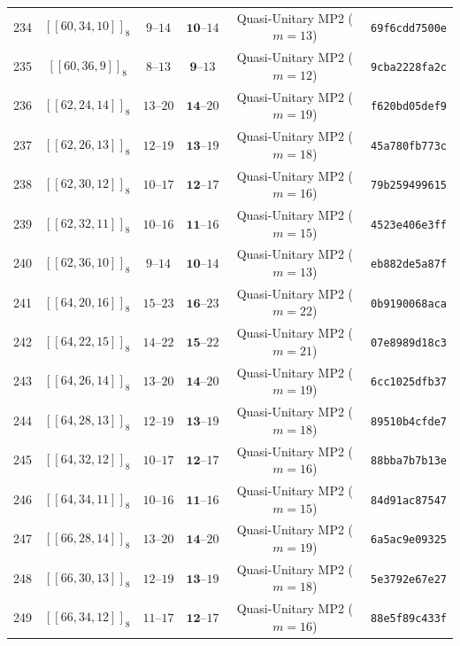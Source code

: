 \documentclass[11pt,a4paper]{article}
\theoremstyle{remark}
\begin{document}
{\begin{longtable}{@{}rccccl@{}}
234 & $[[60,34,10]]_{8}$ & $9\text{--}14$ & $\mathbf{10}\text{--}14$ & Quasi-Unitary MP2 ($m=13$) & \texttt{69f6cdd7500e} \\
235 & $[[60,36,9]]_{8}$ & $8\text{--}13$ & $\mathbf{9}\text{--}13$ & Quasi-Unitary MP2 ($m=12$) & \texttt{9cba2228fa2c} \\
236 & $[[62,24,14]]_{8}$ & $13\text{--}20$ & $\mathbf{14}\text{--}20$ & Quasi-Unitary MP2 ($m=19$) & \texttt{f620bd05def9} \\
237 & $[[62,26,13]]_{8}$ & $12\text{--}19$ & $\mathbf{13}\text{--}19$ & Quasi-Unitary MP2 ($m=18$) & \texttt{45a780fb773c} \\
238 & $[[62,30,12]]_{8}$ & $10\text{--}17$ & $\mathbf{12}\text{--}17$ & Quasi-Unitary MP2 ($m=16$) & \texttt{79b259499615} \\
239 & $[[62,32,11]]_{8}$ & $10\text{--}16$ & $\mathbf{11}\text{--}16$ & Quasi-Unitary MP2 ($m=15$) & \texttt{4523e406e3ff} \\
240 & $[[62,36,10]]_{8}$ & $9\text{--}14$ & $\mathbf{10}\text{--}14$ & Quasi-Unitary MP2 ($m=13$) & \texttt{eb882de5a87f} \\
241 & $[[64,20,16]]_{8}$ & $15\text{--}23$ & $\mathbf{16}\text{--}23$ & Quasi-Unitary MP2 ($m=22$) & \texttt{0b9190068aca} \\
242 & $[[64,22,15]]_{8}$ & $14\text{--}22$ & $\mathbf{15}\text{--}22$ & Quasi-Unitary MP2 ($m=21$) & \texttt{07e8989d18c3} \\
243 & $[[64,26,14]]_{8}$ & $13\text{--}20$ & $\mathbf{14}\text{--}20$ & Quasi-Unitary MP2 ($m=19$) & \texttt{6cc1025dfb37} \\
244 & $[[64,28,13]]_{8}$ & $12\text{--}19$ & $\mathbf{13}\text{--}19$ & Quasi-Unitary MP2 ($m=18$) & \texttt{89510b4cfde7} \\
245 & $[[64,32,12]]_{8}$ & $10\text{--}17$ & $\mathbf{12}\text{--}17$ & Quasi-Unitary MP2 ($m=16$) & \texttt{88bba7b7b13e} \\
246 & $[[64,34,11]]_{8}$ & $10\text{--}16$ & $\mathbf{11}\text{--}16$ & Quasi-Unitary MP2 ($m=15$) & \texttt{84d91ac87547} \\
247 & $[[66,28,14]]_{8}$ & $13\text{--}20$ & $\mathbf{14}\text{--}20$ & Quasi-Unitary MP2 ($m=19$) & \texttt{6a5ac9e09325} \\
248 & $[[66,30,13]]_{8}$ & $12\text{--}19$ & $\mathbf{13}\text{--}19$ & Quasi-Unitary MP2 ($m=18$) & \texttt{5e3792e67e27} \\
249 & $[[66,34,12]]_{8}$ & $11\text{--}17$ & $\mathbf{12}\text{--}17$ & Quasi-Unitary MP2 ($m=16$) & \texttt{88e5f89c433f} \\

\end{longtable}}
\end{document}
